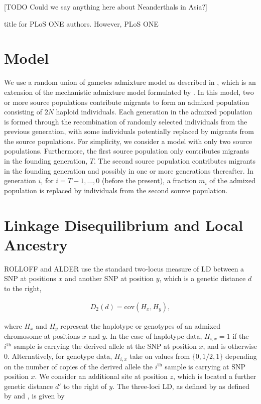 \documentclass[10pt]{article}
\begin{document}
[TODO Could we say anything here about Neanderthals in Asia?]

title for PLoS ONE authors. However, PLoS ONE %
\section{Model} We use a random union of gametes admixture model as described in
\cite{liang2014understanding}, which is an extension of the mechanistic
admixture model formulated by \cite{verdu2011general}. In this model, two or
more source populations contribute migrants to form an admixed population
consisting of $2N$ haploid individuals. Each generation in the admixed
population is formed through the recombination of randomly selected individuals
from the previous generation, with some individuals potentially replaced by
migrants from the source populations. For simplicity, we consider a model with
only two source populations. Furthermore, the first source population only
contributes migrants in the founding generation, $T$. The second source
population contributes migrants in the founding generation and possibly in one
or more generations thereafter. In generation $i$, for $i=T-1,\dots,0$ (before
the present), a fraction $m_i$ of the admixed population is replaced by
individuals from the second source population.

\section{Linkage Disequilibrium and Local Ancestry} ROLLOFF and ALDER use the
standard two-locus measure of LD between a SNP at positions $x$ and another SNP
at position $y$, which is a genetic distance $d$ to the right,

\begin{align} D_2(d) = \text{cov}(H_x,H_y), \label{D2} \end{align}

where $H_x$ and $H_y$ represent the haplotype or genotypes of an admixed
chromosome at positions $x$ and $y$. In the case of haplotype data, $H_{i,x}=1$
if the $i^\text{th}$ sample is carrying the derived allele at the SNP at
position $x$, and is otherwise 0. Alternatively, for genotype data, $H_{i,x}$
take on values from $\{0,1/2,1\}$ depending on the number of copies of the
derived allele the $i^\text{th}$ sample is carrying at SNP position $x$. We
consider an additional site at position $z$, which is located a further genetic
distance $d'$ to the right of $y$. The three-loci LD, as defined by as defined
by \cite{bennett1952theory} and \cite{slatkin1972treating}, is given by
\end{document}
